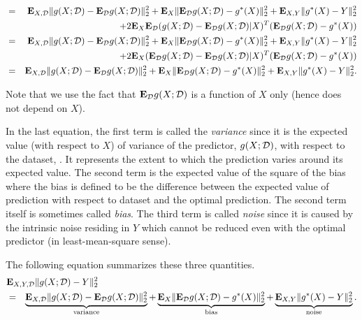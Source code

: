 \begin{eqnarray*}
\\
&=&
	{\bf E{}}_{X,{\mathcal{D}}} \|g(X;{\mathcal{D}}) - {\bf E{}}_{{\mathcal{D}}} g(X; {\mathcal{D}})\|_2^2
	+ {\bf E{}}_{X} \| {\bf E{}}_{{\mathcal{D}}} g(X; {\mathcal{D}}) -g^\ast(X) \|_2^2
	+ {\bf E{}}_{X,Y} \|g^\ast(X)- Y\|_2^2
\\
&&
	+ 2{\bf E{}}_{X} {\bf E{}}_{{\mathcal{D}}} (g(X;{\mathcal{D}}) - {\bf E{}}_{{\mathcal{D}}} g(X; {\mathcal{D}})|X)^T ({\bf E{}}_{{\mathcal{D}}} g(X; {\mathcal{D}}) -g^\ast(X))
\\
&=&
	{\bf E{}}_{X,{\mathcal{D}}} \|g(X;{\mathcal{D}}) - {\bf E{}}_{{\mathcal{D}}} g(X; {\mathcal{D}})\|_2^2
	+ {\bf E{}}_{X} \| {\bf E{}}_{{\mathcal{D}}} g(X; {\mathcal{D}}) -g^\ast(X) \|_2^2
	+ {\bf E{}}_{X,Y} \|g^\ast(X)- Y\|_2^2
\\
&&
	+ 2{\bf E{}}_{X} ({\bf E{}}_{{\mathcal{D}}} g(X;{\mathcal{D}}) - {\bf E{}}_{{\mathcal{D}}} g(X; {\mathcal{D}})|X)^T ({\bf E{}}_{{\mathcal{D}}} g(X; {\mathcal{D}}) -g^\ast(X))
\\
&=&
	{\bf E{}}_{X,{\mathcal{D}}} \|g(X;{\mathcal{D}}) - {\bf E{}}_{{\mathcal{D}}} g(X; {\mathcal{D}})\|_2^2
	+ {\bf E{}}_{X} \| {\bf E{}}_{{\mathcal{D}}} g(X; {\mathcal{D}}) -g^\ast(X) \|_2^2
	+ {\bf E{}}_{X,Y} \|g^\ast(X)- Y\|_2^2.
\end{eqnarray*}

Note that we use the fact that ${\bf E{}}_{{\mathcal{D}}} g(X;{\mathcal{D}})$ is a function of $X$ only
(hence does not depend on $X$).

In the last equation,
the first term is called the \emph{variance} since it is the expected value (with respect to $X$) of variance of the predictor, $g(X;{\mathcal{D}})$,
with respect to the dataset, \dataset.
It represents the extent to which the prediction varies around its expected value.
The second term is the expected value of the square of the bias
where the bias is defined to be the difference between the expected value of prediction with respect to dataset and the optimal prediction.
The second term itself is sometimes called \emph{bias}.
The third term is called \emph{noise} since it is caused by the intrinsic noise residing in $Y$
which cannot be reduced even with the optimal predictor (in least-mean-square sense).

The following equation summarizes these three quantities.
\begin{eqnarray}
\label{eq:var-bias-noise}
\lefteqn{
\Expect_{X,Y,\dataset} \|g(X;\dataset) - Y\|_2^2
}
\\
&=&
\underbrace{\Expect_{X,\dataset} \|g(X;\dataset) - \Expect_\dataset g(X; \dataset)\|_2^2}_\text{variance}
+
\underbrace{\Expect_{X} \| \Expect_\dataset g(X; \dataset) -g^\ast(X) \|_2^2}_\text{bias}
+
\underbrace{\Expect_{X,Y} \|g^\ast(X)- Y\|_2^2}_\text{noise}.
\nonumber
\end{eqnarray}


